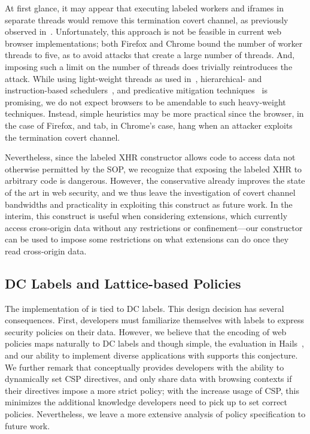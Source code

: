 At first glance, it may appear that executing labeled workers and
iframes in separate threads would remove this termination covert
channel, as previously observed in~\cite{stefan:addressing-covert}. 
%
Unfortunately, this approach is not be feasible in current web browser
implementations; both Firefox and Chrome bound the number of worker
threads to five, as to avoid attacks that create a large number of
threads.
%
And, imposing such a limit on the number of threads does trivially
reintroduces the attack.
%
While using light-weight threads as used in~\cite{stefan:addressing-covert},
hierarchical- and instruction-based
schedulers~\cite{stefan:2013:eliminating,buiras2013library}, and predicative
mitigation techniques~\cite{askarov:termination-insensitive} is promising, we do
not expect browsers to be amendable to such heavy-weight techniques.
%
Instead, simple heuristics may be more practical since the browser,
in the case of Firefox, and tab, in Chrome's case, hang when an
attacker exploits the termination covert channel.

Nevertheless, since the labeled XHR constructor allows code to access
data not otherwise permitted by the SOP, we recognize that exposing
the labeled XHR to arbitrary code is dangerous.
%
However, the conservative \sys{} already improves the state of the art
in web security, and we thus leave the investigation of covert channel
bandwidths and practicality in exploiting this construct as future
work.
%
In the interim, this construct is useful when considering extensions,
which currently access cross-origin data without any restrictions or
confinement---our constructor can be used to impose some restrictions
on what extensions can do once they read cross-origin data.

\subsection{DC Labels and Lattice-based Policies}
\label{sec:discussion:lattice}

The implementation of \sys{} is tied to DC labels.
%
This design decision has several consequences.
%
First, developers must familiarize themselves with labels to express
security policies on their data.
%
However, we believe that the encoding of web policies maps naturally
to DC labels and though simple, the evaluation in
Hails~\cite{giffin:2012:hails}, and our ability to implement diverse
applications with \sys{} supports this conjecture.
%
We further remark that \sys{} conceptually provides developers with
the ability to dynamically set CSP directives, and only share data
with browsing contexts if their directives impose a more strict
policy; with the increase usage of CSP, this minimizes the additional
knowledge developers need to pick up to set correct policies.
%
Nevertheless, we leave a more extensive analysis of policy
specification to future work.
 

